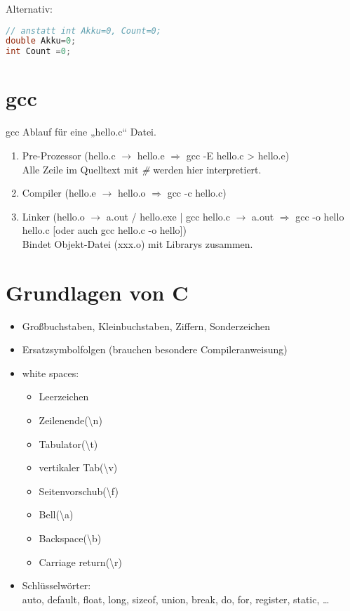 Alternativ:
\begin{lstlisting}[language=C]
// anstatt int Akku=0, Count=0;
double Akku=0;
int Count =0;
\end{lstlisting}

\chapter{gcc}

gcc Ablauf für eine „hello.c“ Datei.

\begin{enumerate}
\item Pre-Prozessor (hello.c $\rightarrow$ hello.e $\Rightarrow$ gcc -E hello.c > hello.e) \\
Alle Zeile im Quelltext mit \emph{\#} werden hier interpretiert.
\item Compiler (hello.e $\rightarrow$ hello.o $\Rightarrow$ gcc -c hello.c)
\item Linker (hello.o $\rightarrow$ a.out / hello.exe | gcc hello.c $\rightarrow$ a.out $\Rightarrow$ gcc -o hello hello.c [oder auch gcc hello.c -o hello])\\
Bindet Objekt-Datei (xxx.o) mit Librarys zusammen.
\end{enumerate}

\chapter{Grundlagen von C}

\begin{itemize}
\item Großbuchstaben, Kleinbuchstaben, Ziffern, Sonderzeichen
\item Ersatzsymbolfolgen (brauchen besondere Compileranweisung)
\item white spaces: 
\begin{itemize}
\item Leerzeichen
\item Zeilenende(\textbackslash n)
\item Tabulator(\textbackslash t)
\item vertikaler Tab(\textbackslash v)
\item Seitenvorschub(\textbackslash f)
\item Bell(\textbackslash a)
\item Backspace(\textbackslash b)
\item Carriage return(\textbackslash r)
\end{itemize}
\item Schlüsselwörter:\\
auto, default, float, long, sizeof, union, break, do, for, register, static, …
\end{itemize}

